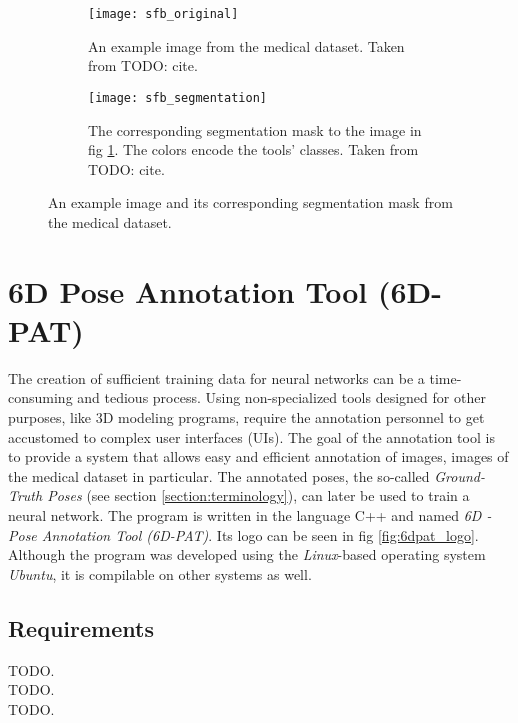 \begin{figure}[!tbp]
	\centering
	\begin{subfigure}[t]{0.47\textwidth}
	\centering
    	\texttt{[image: sfb\_original]}
    	\caption{An example image from the medical dataset. Taken from TODO: cite.}
    	\label{fig:sfb_original}
	\end{subfigure}
	\hfill
	\begin{subfigure}[t]{0.47\textwidth}
	\centering
    	\texttt{[image: sfb\_segmentation]}
    	\caption{The corresponding segmentation mask to the image in fig \ref{fig:sfb_original}. The colors encode the tools' classes. Taken from TODO: cite.}
    	\label{fig:sfb_segmentation}
	\end{subfigure}
	\caption{An example image and its corresponding segmentation mask from the medical dataset.}
	\label{fig:sfb}
\end{figure} 

\section{6D Pose Annotation Tool (6D-PAT)}

The creation of sufficient training data for neural networks can be a time-consuming and tedious process. Using non-specialized tools designed for other purposes, like 3D modeling programs, require the annotation personnel to get accustomed to complex user interfaces (UIs). The goal of the annotation tool is to provide a system that allows easy and efficient annotation of images, images of the medical dataset in particular. The annotated poses, the so-called \textit{Ground-Truth Poses} (see section \ref{section:terminology}), can later be used to train a neural network. The program is written in the language C++ and named \textit{6D - Pose Annotation Tool (6D-PAT)}. Its logo can be seen in fig \ref{fig:6dpat_logo}. Although the program was developed using the \textit{Linux}-based operating system \textit{Ubuntu}, it is compilable on other systems as well.

\subsection{Requirements}

TODO. \\

TODO. \\

TODO. \\

